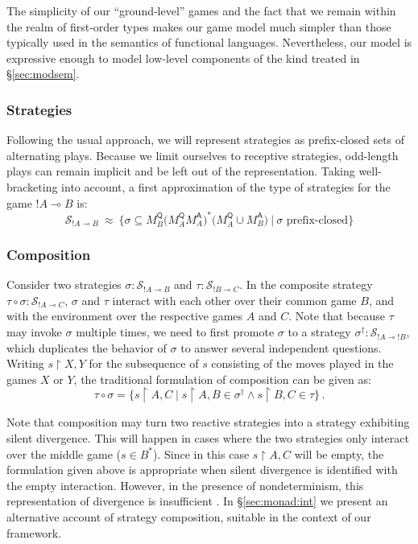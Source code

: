 \documentclass[acmsmall,timestamp,review,anonymous]{acmart}
\newcommand{\kw}[1]{\ensuremath{ \mathsf{#1} }}
\begin{document}
The simplicity of our ``ground-level'' games
and the fact that we remain within the realm of
first-order types
makes our game model much simpler than
those typically used in the semantics of functional languages.
Nevertheless,
our model is expressive enough to model low-level components
of the kind treated in \S\ref{sec:modsem}.


\subsubsection{Strategies} %

Following the usual approach,
we will represent strategies as prefix-closed sets of alternating plays.
Because we limit ourselves to receptive strategies,
odd-length plays can remain implicit and be left out of the representation.
Taking well-bracketing into account,
a first approximation of the type of strategies
for the game $!A \multimap B$ is:
\[
  \mathcal{S}_{!A \multimap B} \: \approx \:
   \big\{ \sigma \subseteq
      M^\kw{Q}_B
      \big( M^\kw{Q}_A M^\kw{A}_A \big)^*
      \big( M^\kw{Q}_A \cup M^\kw{A}_B \big) \: \big| \:
      \sigma \mbox{ prefix-closed} \big\}
\]


\subsubsection{Composition} \label{sec:sem:games:comp} %

Consider two strategies
$\sigma : \mathcal{S}_{!A \multimap B}$ and
$\tau : \mathcal{S}_{!B \multimap C}$.
In the composite strategy
$\tau \circ \sigma : \mathcal{S}_{!A \multimap C}$,
$\sigma$ and $\tau$ interact
with each other over their common game $B$,
and with the environment over the respective games $A$ and $C$.
Note that because $\tau$ may invoke $\sigma$ multiple times,
we need to first promote $\sigma$ to a strategy
$\sigma^\dagger : \mathcal{S}_{{!A} \multimap {!B}}$,
which duplicates the behavior of $\sigma$ to answer several independent questions.
Writing $s \restriction X,Y$ for
the subsequence of $s$ consisting of the moves played in the games $X$ or $Y$,
the traditional formulation of composition
can be given as:
\[
    \tau \circ \sigma =
    \{ s \restriction {A,C} \mid
       s \restriction {A,B} \in \sigma^\dagger \wedge
       s \restriction {B,C} \in \tau \} \,.
\]

Note that composition may turn two reactive strategies
into a strategy exhibiting silent divergence.
This will happen in cases where
the two strategies only interact over the middle game ($s \in B^*$).
Since in this case $s \restriction A,C$ will be empty,
the formulation given above is appropriate when
silent divergence is identified with the empty interaction.
However,
in the presence of nondeterminism,
this representation of divergence is insufficient \cite{gsnondet}.
In \S\ref{sec:monad:int}
we present an alternative
account of strategy composition,
suitable in the context of our framework.
\end{document}
